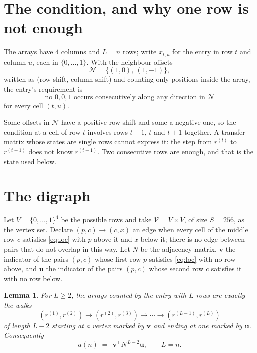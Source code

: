 \documentclass[11pt,a4paper]{article}
\theoremstyle{plain}
\newtheorem{lemma}[theorem]{Lemma}
\theoremstyle{definition}
\begin{document}
\section{The condition, and why one row is not enough}

The arrays have $4$ columns and $L=n$ rows; write $x_{t,u}$ for the entry in
row $t$ and column $u$, each in $\{0,\dots,1\}$. With the neighbour offsets
\[
\mathcal N=\{(1,0),\ (1,-1)\},
\]
written as (row shift, column shift) and counting only positions inside the array, the
entry's requirement is
\begin{equation}\label{eq:loc}
\text{no }0,0,1\text{ occurs consecutively along any direction in }\mathcal N
\end{equation}
for every cell $(t,u)$.

Some offsets in $\mathcal N$ have a positive row shift and some a negative one, so the
condition at a cell of row $t$ involves rows $t-1$, $t$ and $t+1$ together. A transfer
matrix whose states are single rows cannot express it: the step from $r^{(t)}$ to
$r^{(t+1)}$ does not know $r^{(t-1)}$. Two consecutive rows are enough, and that is
the state used below.

\section{The digraph}

Let $V=\{0,\dots,1\}^{4}$ be the possible rows and take
$\mathcal V=V\times V$, of size $S=256$, as the vertex set. Declare $(p,c)\to(c,x)$ an edge
when every cell of the middle row $c$ satisfies \eqref{eq:loc} with $p$ above it and $x$
below it; there is no edge between pairs that do not overlap in this way. Let $N$ be the
adjacency matrix, $\mathbf{v}$ the indicator of the pairs $(p,c)$ whose first row $p$
satisfies \eqref{eq:loc} with no row above, and $\mathbf{u}$ the indicator of
the pairs $(p,c)$ whose second row $c$ satisfies it with no row below.

\begin{lemma}\label{lem:walk}
For $L\ge2$, the arrays counted by the entry with $L$ rows are exactly the walks
\[
(r^{(1)},r^{(2)})\to(r^{(2)},r^{(3)})\to\cdots\to(r^{(L-1)},r^{(L)})
\]
of length $L-2$ starting at a vertex marked by $\mathbf{v}$ and ending at one marked by
$\mathbf{u}$. Consequently
\[
a(n)\;=\;\,\mathbf{v}^{\!\top}N^{\,L-2}\mathbf{u},\qquad L=n .
\]
\end{lemma}
\end{document}
